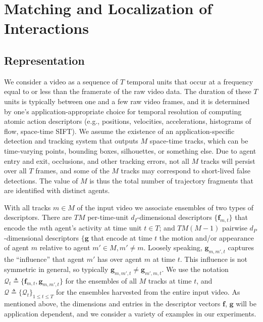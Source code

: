 \section{Matching and Localization of Interactions}

\subsection{Representation}

We consider a video as a sequence of $T$ temporal units that occur at a frequency equal to or less than the framerate of the raw video data. The duration of these $T$ units is typically between one and a  few raw video frames, and it is determined by one's application-appropriate choice for temporal resolution of computing atomic action descriptors (e.g., positions, velocities, accelerations, histograms of flow, space-time SIFT). We assume the existence of an application-specific detection and tracking system that outputs $M$ space-time tracks, which can be time-varying points, bounding boxes, silhouettes, or something else. Due to agent entry and exit, occlusions, and other tracking errors, not all $M$ tracks will persist over all $T$ frames, and some of the $M$ tracks may correspond to short-lived false detections.  The value of $M$ is thus the total number of trajectory fragments that are identified with distinct agents.

With all tracks $m\in M$ of the input video we associate ensembles of two types of descriptors. There are $TM$ per-time-unit $d_{I}$-dimensional descriptors $\{\mathbf{f}_{m,t}\}$ that encode the $m$th agent's activity at time unit $t\in T$; and $TM(M-1)$ pairwise $d_{P}$-dimensional descriptors $\{\mathbf{g}$ that encode at time $t$ the motion and/or appearance of agent $m$ relative to agent $m'\in M, m'\ne m$. Loosely speaking, $\mathbf{g}_{m,m',t}$ captures the ``influence'' that agent $m'$ has over agent $m$ at time $t$. This influence is not symmetric in general, so typically $\mathbf{g}_{m,m',t}\ne \mathbf{g}_{m',m,t}$.  We use the notation $\mathcal{Q}_{t}\triangleq\{\mathbf{f}_{m,t},\mathbf{g}_{m,m',t}\}$ for the ensembles of all $M$ tracks at time $t$, and $\mathcal{Q}\triangleq\{\mathcal{Q}_{t}\}_{1\leq t\leq T}$ for the ensembles harvested from the entire input video. As mentioned above, the dimensions and entries in the descriptor vectors $\mathbf{f}$, $\mathbf{g}$ will be application dependent, and we consider a variety of examples in our experiments.

